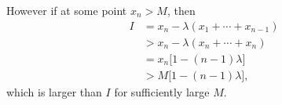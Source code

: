 However if at some point $x_n>M$, then
\begin{align*}
I&=x_n-\lambda(x_1+\cdots+x_{n-1})\\
&>x_n-\lambda(x_n+\cdots+x_n)\\
&=x_n\big[1-(n-1)\lambda\big]\\
&>M\big[1-(n-1)\lambda\big],
\end{align*}
which is larger than $I$ for sufficiently large $M$.

